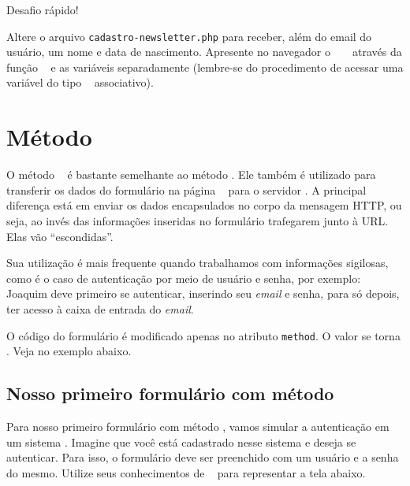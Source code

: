 \begin{framed}
{\Large Desafio rápido!}

Altere o arquivo \texttt{cadastro-newsletter.php} para receber, além do email do 
usuário, um nome e data de nascimento. Apresente no navegador  
o \tipoarray~ \variavelget~ através da função \funcaoprintr~ e as variáveis
separadamente (lembre-se do procedimento de acessar uma variável do tipo \tipoarray~
associativo).
\end{framed}

\section{Método \metodoPOST}
\label{metodo-post}

O método \metodoPOST~ é bastante semelhante ao método \metodoGET. Ele também é utilizado
para transferir os dados do formulário na página \html~ para o servidor \php. A principal
diferença está em enviar os dados encapsulados no corpo da mensagem HTTP, ou seja,
ao invés das informações inseridas no formulário trafegarem junto à URL. Elas vão
``escondidas''. 

Sua utilização é mais frequente quando trabalhamos com informações sigilosas, como é o caso
de autenticação por meio de usuário e senha, por exemplo: Joaquim deve primeiro se autenticar,
inserindo seu \textit{email} e senha, para só depois, ter acesso à caixa de entrada do \textit{email}.

O código do formulário é modificado apenas no atributo \texttt{method}. O valor se torna
\metodoPOST. Veja no exemplo abaixo.



\subsection{Nosso primeiro formulário com método \metodoPOST}
\label{nosso-primeiro-formulario-com-metodo-post}

Para nosso primeiro formulário com método \metodoPOST, vamos simular a autenticação em um 
sistema \web. Imagine que você está cadastrado nesse sistema e deseja se autenticar. 
Para isso, o formulário deve ser preenchido com um usuário e a senha do mesmo.
Utilize seus conhecimentos de \html~ para representar a tela abaixo.


